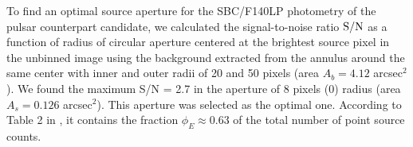 \documentclass[pdftex,twocolumn]{aastex62}
\begin{document}
To find an optimal source aperture for the SBC/F140LP photometry of the pulsar counterpart candidate,
we calculated the signal-to-noise ratio 
${\rm S/N}$ as a function of  radius of 
circular aperture centered at the brightest source pixel in the unbinned image using 
the background extracted from the annulus around the same center with inner and outer radii of 20 %
and 50 %
pixels 
(area $A_b=4.12$ %
arcsec$^2$). 
We found the maximum S/N = 2.7 in the aperture 
of 8 pixels (0) radius
(area $A_s=0.126$ arcsec$^2$). This aperture was selected as the optimal one. 
According to Table 2 in \citet{Avila2016}, 
it contains the fraction $\phi_E\approx 0.63$ of the total number of point source counts. 
\end{document}
